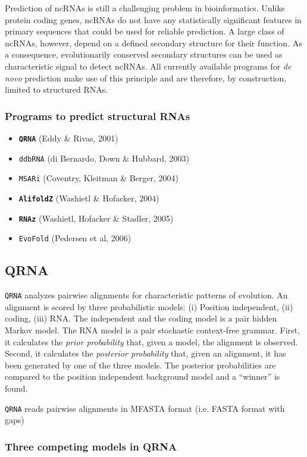 \documentclass[a4paper]{article}
\newcommand{\frametitle}[1]{\subsubsection{#1}}
\begin{document}
Prediction of ncRNAs is still a challenging problem in bioinformatics.
Unlike protein coding genes, ncRNAs do not have any statistically
significant features in primary sequences that could be used for reliable
prediction. A large class of ncRNAs, however, depend on a defined secondary
structure for their function. As a consequence, evolutionarily conserved
secondary structures can be used as characteristic signal to detect ncRNAs.
All currently available programs for \emph{de novo} prediction make use of
this principle and are therefore, by construction, limited to structured
RNAs.

  \frametitle{Programs to predict structural RNAs}
  \begin{itemize}
    \item \texttt{\textbf{QRNA}} (Eddy \& Rivas, 2001)
    \item \texttt{ddbRNA} (di Bernardo, Down \& Hubbard, 2003)
    \item \texttt{MSARi} (Coventry, Kleitman \& Berger, 2004)
    \item \texttt{\textbf{AlifoldZ}} (Washietl \& Hofacker, 2004)
    \item \texttt{\textbf{RNAz}} (Washietl, Hofacker \& Stadler, 2005)
    \item \texttt{EvoFold} (Pedersen et al, 2006)
  \end{itemize}

\subsection{QRNA}
\texttt{QRNA} analyzes pairwise alignments for characteristic patterns of
evolution. An alignment is scored by three probabilistic models: (i)
Position independent, (ii) coding, (iii) RNA. The independent and the
coding model is a pair hidden Markov model. The RNA model is a pair
stochastic context-free grammar.  First, it calculates the \emph{prior
probability} that, given a model, the alignment is observed. Second, it
calculates the \emph{posterior probability} that, given an alignment, it
has been generated by one of the three models. The posterior probabilities
are compared to the position independent background model and a ``winner''
is found.

\texttt{QRNA} reads pairwise alignments in MFASTA format (i.e. FASTA format
  with gaps)

\frametitle{Three competing models in QRNA}
\end{document}
